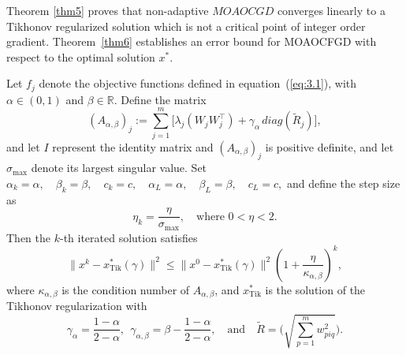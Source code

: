 \documentclass[smallextended,referee,envcountsect]{svjour3}
\begin{document}
Theorem \ref{thm5} proves that non-adaptive $MOAOCGD$ converges linearly to a Tikhonov regularized solution which is not a critical point of integer order gradient. Theorem~\ref{thm6} establishes an error bound for MOAOCFGD with respect to the optimal solution $x^*$.  
\begin{theorem}\label{thm5}
Let \( f_j \) denote the objective functions defined in equation~(\ref{eq:3.1}), with \( \alpha \in (0,1) \) and \( \beta \in \mathbb{R} \). Define the matrix
\[
(A_{\alpha,\beta})_j := \sum_{j=1}^{m} \Big[ \lambda_j (W_j W_j^\top) + \gamma_\alpha \, diag(\tilde{R}_j) \Big],
\]
and let \( I \) represent the identity matrix and \( (A_{\alpha,\beta})_j \) is positive definite, and let \( \sigma_{\max} \) denote its largest singular value. Set
\(
\alpha_k = \alpha, \quad \beta_k = \beta, \quad c_k = c, \quad \alpha_L = \alpha, \quad \beta_L = \beta, \quad c_L = c,
\)
and define the step size as
\[
\eta_k = \frac{\eta}{\sigma_{\max}}, \quad \text{where } 0 < \eta < 2.
\]
Then the $k$-th iterated solution satisfies
\[
\|x^k - x^{*}_{\text{Tik}}(\gamma)\|^2 \leq \|x^{0} - x^{*}_{\text{Tik}}(\gamma)\|^2 (1 + \frac{\eta} {\kappa_{\alpha,\beta}})^k,
\]
where $\kappa_{\alpha,\beta}$ is the condition number of $A_{\alpha,\beta}$, and $x^{*}_{\text{Tik}}$ is the solution of the Tikhonov regularization with
\[
\gamma_{\alpha} = \frac{1-\alpha}{2-\alpha},~~\gamma_{\alpha,\beta} = \beta - \frac{1 - \alpha}{2 - \alpha}, \quad \text{and} \quad \tilde{R}=  \Big( \sqrt{\sum_{p=1}^{m} w_{piq}^2} \Big).
\]
\end{theorem}
\end{document}
